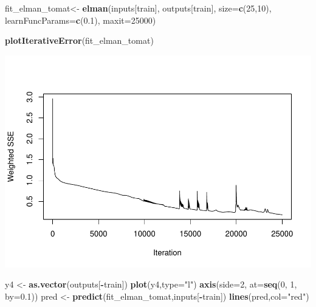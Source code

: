 \documentclass[
]{book}
\newenvironment{Shaded}{\begin{snugshade}}{\end{snugshade}}
\newcommand{\AttributeTok}[1]{\textcolor[rgb]{0.13,0.29,0.53}{#1}}
\newcommand{\DecValTok}[1]{\textcolor[rgb]{0.00,0.00,0.81}{#1}}
\newcommand{\FloatTok}[1]{\textcolor[rgb]{0.00,0.00,0.81}{#1}}
\newcommand{\FunctionTok}[1]{\textcolor[rgb]{0.13,0.29,0.53}{\textbf{#1}}}
\newcommand{\NormalTok}[1]{#1}
\newcommand{\OtherTok}[1]{\textcolor[rgb]{0.56,0.35,0.01}{#1}}
\newcommand{\SpecialCharTok}[1]{\textcolor[rgb]{0.81,0.36,0.00}{\textbf{#1}}}
\newcommand{\StringTok}[1]{\textcolor[rgb]{0.31,0.60,0.02}{#1}}
\begin{document}
\begin{Shaded}
\begin{Highlighting}[]
\NormalTok{fit\_elman\_tomat}\OtherTok{\textless{}{-}} \FunctionTok{elman}\NormalTok{(inputs[train],}
\NormalTok{                       outputs[train],}
                       \AttributeTok{size=}\FunctionTok{c}\NormalTok{(}\DecValTok{25}\NormalTok{,}\DecValTok{10}\NormalTok{),}
                       \AttributeTok{learnFuncParams=}\FunctionTok{c}\NormalTok{(}\FloatTok{0.1}\NormalTok{),}
                       \AttributeTok{maxit=}\DecValTok{25000}\NormalTok{)}


\FunctionTok{plotIterativeError}\NormalTok{(fit\_elman\_tomat)}
\end{Highlighting}
\end{Shaded}

\includegraphics{bookdown-demo_files/figure-latex/unnamed-chunk-194-1.pdf}

\begin{Shaded}
\begin{Highlighting}[]
\NormalTok{y4 }\OtherTok{\textless{}{-}} \FunctionTok{as.vector}\NormalTok{(outputs[}\SpecialCharTok{{-}}\NormalTok{train])}
\FunctionTok{plot}\NormalTok{(y4,}\AttributeTok{type=}\StringTok{"l"}\NormalTok{)}
\FunctionTok{axis}\NormalTok{(}\AttributeTok{side=}\DecValTok{2}\NormalTok{, }\AttributeTok{at=}\FunctionTok{seq}\NormalTok{(}\DecValTok{0}\NormalTok{, }\DecValTok{1}\NormalTok{, }\AttributeTok{by=}\FloatTok{0.1}\NormalTok{))}
\NormalTok{pred }\OtherTok{\textless{}{-}} \FunctionTok{predict}\NormalTok{(fit\_elman\_tomat,inputs[}\SpecialCharTok{{-}}\NormalTok{train])}
\FunctionTok{lines}\NormalTok{(pred,}\AttributeTok{col=}\StringTok{"red"}\NormalTok{)}
\end{Highlighting}
\end{Shaded}
\end{document}

